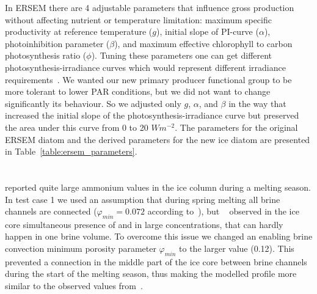 \documentclass[gmd, manuscript]{copernicus}
\begin{document}
In \textrm{ERSEM} there are 4 adjustable parameters that influence gross production without affecting nutrient or temperature limitation: maximum specific productivity at reference temperature ($g$), initial slope of PI-curve ($\alpha$), photoinhibition parameter ($\beta$), and maximum effective chlorophyll to carbon photosynthesis ratio ($\phi$).
Tuning these parameters one can get different photosynthesis-irradiance curves which would represent different irradiance requirements~\citep[e.g.,][Figure 13, p.~1333]{ersem2016}.
We wanted our new primary producer functional group to be more tolerant to lower \textrm{PAR} conditions, but we did not want to change significantly its behaviour.
So we adjusted only $g$, $\alpha$, and $\beta$ in the way that increased the initial slope of the photosynthesis-irradiance curve but preserved the area under this curve from 0 to 20 $W m^{-2}$.
The parameters for the original \textrm{ERSEM} diatom and the derived parameters for the new ice diatom are presented in Table~\ref{table:ersem_parameters}.

\section{}    %
\label{app:E}

\citet{Rysgaard2004} reported quite large ammonium values in the ice column during a melting season.
In test case 1 we used an assumption that during spring melting all brine channels are connected ($\varphi_{min} = 0.072$ according to~\citet{Arrigo1993}), but ~\citet{Rysgaard2004} observed in the ice core simultaneous presence of  and  in large concentrations, that can hardly happen in one brine volume.
To overcome this issue we changed an enabling brine convection minimum porosity parameter $\varphi_{min}$ to the larger value (0.12).
This prevented a connection in the middle part of the ice core between brine channels during the start of the melting season, thus making the modelled profile more similar to the observed values from~\citet{Rysgaard2004}.



\noappendix       %

\end{document}
